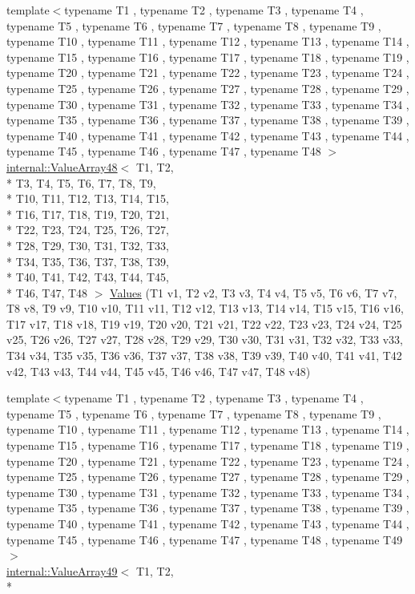 \begin{DoxyCompactItemize}
\item 
{\footnotesize template$<$typename T1 , typename T2 , typename T3 , typename T4 , typename T5 , typename T6 , typename T7 , typename T8 , typename T9 , typename T10 , typename T11 , typename T12 , typename T13 , typename T14 , typename T15 , typename T16 , typename T17 , typename T18 , typename T19 , typename T20 , typename T21 , typename T22 , typename T23 , typename T24 , typename T25 , typename T26 , typename T27 , typename T28 , typename T29 , typename T30 , typename T31 , typename T32 , typename T33 , typename T34 , typename T35 , typename T36 , typename T37 , typename T38 , typename T39 , typename T40 , typename T41 , typename T42 , typename T43 , typename T44 , typename T45 , typename T46 , typename T47 , typename T48 $>$ }\\\hyperlink{classtesting_1_1internal_1_1ValueArray48}{internal\-::\-Value\-Array48}$<$ T1, T2, \\*
T3, T4, T5, T6, T7, T8, T9, \\*
T10, T11, T12, T13, T14, T15, \\*
T16, T17, T18, T19, T20, T21, \\*
T22, T23, T24, T25, T26, T27, \\*
T28, T29, T30, T31, T32, T33, \\*
T34, T35, T36, T37, T38, T39, \\*
T40, T41, T42, T43, T44, T45, \\*
T46, T47, T48 $>$ \hyperlink{namespacetesting_af3cdf373b137d357bb3a814c097bcd06}{Values} (T1 v1, T2 v2, T3 v3, T4 v4, T5 v5, T6 v6, T7 v7, T8 v8, T9 v9, T10 v10, T11 v11, T12 v12, T13 v13, T14 v14, T15 v15, T16 v16, T17 v17, T18 v18, T19 v19, T20 v20, T21 v21, T22 v22, T23 v23, T24 v24, T25 v25, T26 v26, T27 v27, T28 v28, T29 v29, T30 v30, T31 v31, T32 v32, T33 v33, T34 v34, T35 v35, T36 v36, T37 v37, T38 v38, T39 v39, T40 v40, T41 v41, T42 v42, T43 v43, T44 v44, T45 v45, T46 v46, T47 v47, T48 v48)
\item 
{\footnotesize template$<$typename T1 , typename T2 , typename T3 , typename T4 , typename T5 , typename T6 , typename T7 , typename T8 , typename T9 , typename T10 , typename T11 , typename T12 , typename T13 , typename T14 , typename T15 , typename T16 , typename T17 , typename T18 , typename T19 , typename T20 , typename T21 , typename T22 , typename T23 , typename T24 , typename T25 , typename T26 , typename T27 , typename T28 , typename T29 , typename T30 , typename T31 , typename T32 , typename T33 , typename T34 , typename T35 , typename T36 , typename T37 , typename T38 , typename T39 , typename T40 , typename T41 , typename T42 , typename T43 , typename T44 , typename T45 , typename T46 , typename T47 , typename T48 , typename T49 $>$ }\\\hyperlink{classtesting_1_1internal_1_1ValueArray49}{internal\-::\-Value\-Array49}$<$ T1, T2, \\*

\end{DoxyCompactItemize}

